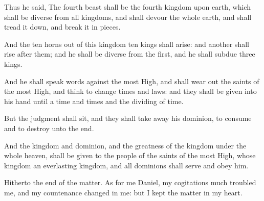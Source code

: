 {Thus he
said, The
fourth
beast shall
be the
fourth
kingdom upon
earth, which shall be
diverse
from
all
kingdoms, and shall
devour the
whole
earth, and shall tread it
down, and break it in
pieces.

And the
ten
horns out
of this
kingdom
{}
ten
kings
{} shall
arise: and
another shall
rise
after them; and he shall be
diverse
from the
first, and he shall
subdue
three
kings.

And he shall
speak
{}
words
against the most
High, and shall wear
out the
saints of the most
High, and
think to
change
times and
laws: and they shall be
given into his
hand
until a
time and
times and the
dividing of
time.

But the
judgment shall
sit, and they shall take
away his
dominion, to
consume and to
destroy
{}
unto the
end.

And the
kingdom and
dominion, and the
greatness of the
kingdom
under the
whole
heaven, shall be
given to the
people of the
saints of the most
High, whose
kingdom
{} an
everlasting
kingdom, and
all
dominions shall
serve and
obey him.

Hitherto
{} the
end of the
matter. As for
me
Daniel, my
cogitations
much
troubled me, and my
countenance
changed in
me: but I
kept the
matter in my
heart.




\par }
